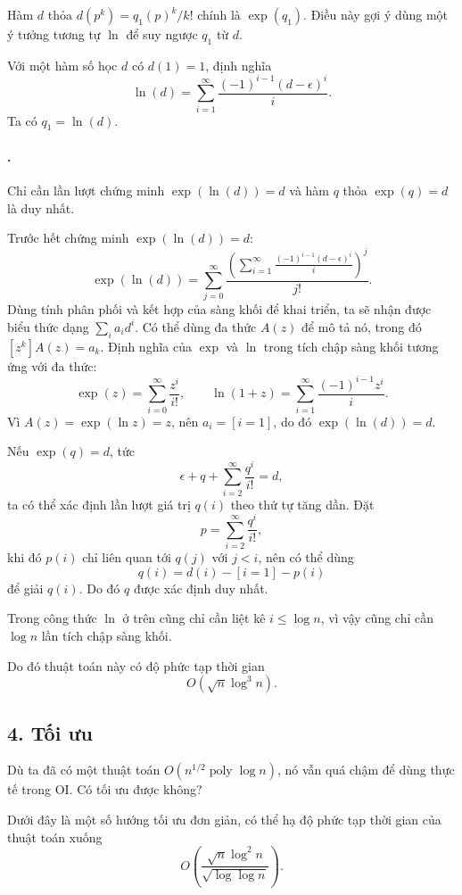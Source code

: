 \documentclass[11pt]{article}
\begin{document}
Hàm \(d\) thỏa \(d(p^k)=q_1(p)^k/k!\) chính là \(\exp(q_1)\). Điều này gợi ý
dùng một ý tưởng tương tự \(\ln\) để suy ngược \(q_1\) từ \(d\).

Với một hàm số học \(d\) có \(d(1)=1\), định nghĩa
\[
  \ln(d)=\sum_{i=1}^{\infty}
  \frac{(-1)^{i-1}(d-\epsilon)^i}{i}.
\]
Ta có \(q_1=\ln(d)\).

\paragraph{.}
Chỉ cần lần lượt chứng minh \(\exp(\ln(d))=d\) và hàm \(q\) thỏa
\(\exp(q)=d\) là duy nhất.

Trước hết chứng minh \(\exp(\ln(d))=d\):
\[
  \exp(\ln(d))
  =
  \sum_{j=0}^{\infty}
  \frac{\left(\sum_{i=1}^{\infty}
  \frac{(-1)^{i-1}(d-\epsilon)^i}{i}\right)^j}{j!}.
\]
Dùng tính phân phối và kết hợp của sàng khối để khai triển, ta sẽ nhận được
biểu thức dạng \(\sum_i a_i d^i\). Có thể dùng đa thức \(A(z)\) để mô tả nó,
trong đó \([z^k]A(z)=a_k\). Định nghĩa của \(\exp\) và \(\ln\) trong tích chập
sàng khối tương ứng với đa thức:
\[
  \exp(z)=\sum_{i=0}^{\infty}\frac{z^i}{i!},\qquad
  \ln(1+z)=\sum_{i=1}^{\infty}\frac{(-1)^{i-1}z^i}{i}.
\]
Vì \(A(z)=\exp(\ln z)=z\), nên \(a_i=[i=1]\), do đó \(\exp(\ln(d))=d\).

Nếu \(\exp(q)=d\), tức
\[
  \epsilon+q+\sum_{i=2}^{\infty}\frac{q^i}{i!}=d,
\]
ta có thể xác định lần lượt giá trị \(q(i)\) theo thứ tự tăng dần. Đặt
\[
  p=\sum_{i=2}^{\infty}\frac{q^i}{i!},
\]
khi đó \(p(i)\) chỉ liên quan tới \(q(j)\) với \(j<i\), nên có thể dùng
\[
  q(i)=d(i)-[i=1]-p(i)
\]
để giải \(q(i)\). Do đó \(q\) được xác định duy nhất.

Trong công thức \(\ln\) ở trên cũng chỉ cần liệt kê \(i\le\log n\), vì vậy
cũng chỉ cần \(\log n\) lần tích chập sàng khối.

Do đó thuật toán này có độ phức tạp thời gian
\[
  O(\sqrt n\log^3 n).
\]

\subsection*{4. Tối ưu}

Dù ta đã có một thuật toán \(O(n^{1/2}\operatorname{poly}\log n)\), nó vẫn quá
chậm để dùng thực tế trong OI. Có tối ưu được không?

Dưới đây là một số hướng tối ưu đơn giản, có thể hạ độ phức tạp thời gian của
thuật toán xuống
\[
  O\left(\frac{\sqrt n\log^2 n}{\sqrt{\log\log n}}\right).
\]
\end{document}
